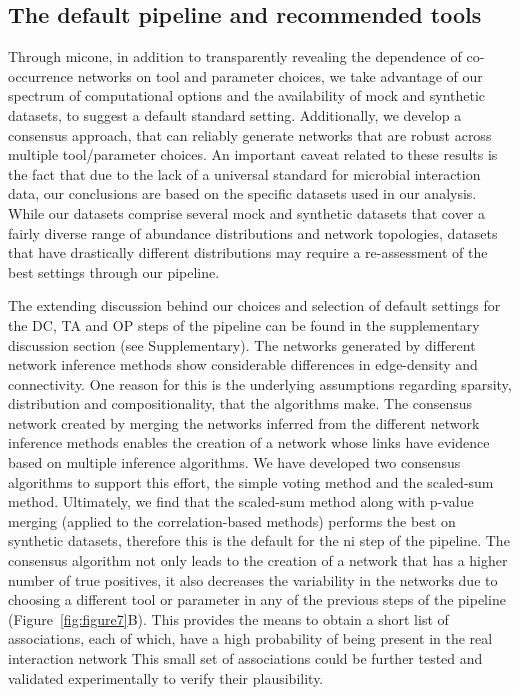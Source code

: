   \subsection*{The default pipeline and recommended tools}

  Through \ac{micone}, in addition to transparently revealing the dependence of co-occurrence networks on tool and parameter choices, we take advantage of our spectrum of computational options and the availability of mock and synthetic datasets, to suggest a default standard setting.
  Additionally, we develop a consensus approach, that can reliably generate networks that are robust across multiple tool/parameter choices.
  An important caveat related to these results is the fact that due to the lack of a universal standard for microbial interaction data, our conclusions are based on the specific datasets used in our analysis.
  While our datasets comprise several mock and synthetic datasets that cover a fairly diverse range of abundance distributions and network topologies, datasets that have drastically different distributions may require a re-assessment of the best settings through our pipeline.

  The extending discussion behind our choices and selection of default settings for the DC, TA and OP steps of the pipeline can be found in the supplementary discussion section (see Supplementary).
  The networks generated by different network inference methods show considerable differences in edge-density and connectivity.
  One reason for this is the underlying assumptions regarding sparsity, distribution and compositionality, that the algorithms make.
  The consensus network created by merging the networks inferred from the different network inference methods enables the creation of a network whose links have evidence based on multiple inference algorithms.
  We have developed two consensus algorithms to support this effort, the simple voting method and the scaled-sum method.
  Ultimately, we find that the scaled-sum method along with p-value merging (applied to the correlation-based methods) performs the best on synthetic datasets, therefore this is the default for the \ac{ni} step of the pipeline.
  The consensus algorithm not only leads to the creation of a network that has a higher number of true positives, it also decreases the variability in the networks due to choosing a different tool or parameter in any of the previous steps of the pipeline (Figure~\ref{fig:figure7}B).
  This provides the means to obtain a short list of associations, each of which, have a high probability of being present in the real interaction network
  This small set of associations could be further tested and validated experimentally to verify their plausibility.

